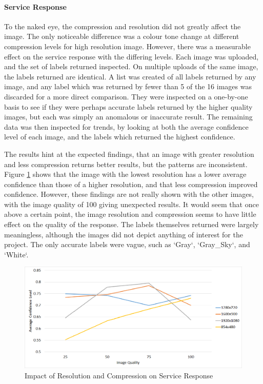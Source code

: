 \documentclass{article}
\begin{document}
\paragraph{Service Response}
To the naked eye, the compression and resolution did not greatly affect the image. The only noticeable difference was a colour tone change at different compression levels for high resolution image. However, there was a measurable effect on the service response with the differing levels. Each image was uploaded, and the set of labels returned inspected. On multiple uploads of the same image, the labels returned are identical. A list was created of all labels returned by any image, and any label which was returned by fewer than 5 of the 16 images was discarded for a more direct comparison. They were inspected on a one-by-one basis to see if they were perhaps accurate labels returned by the higher quality images, but each was simply an anomalous or inaccurate result. The remaining data was then inspected for trends, by looking at both the average confidence level of each image, and the labels which returned the highest confidence. 

The results hint at the expected findings, that an image with greater resolution and less compression returns better results, but the patterns are inconsistent. Figure \ref{fig:ImageResImpact} shows that the image with the lowest resolution has a lower average confidence than those of a higher resolution, and that less compression improved confidence. However, these findings are not really shown with the other images, with the image quality of 100 giving unexpected results. It would seem that once above a certain point, the image resolution and compression seems to have little effect on the quality of the response. The labels themselves returned were largely meaningless, although the images did not depict anything of interest for the project. The only accurate labels were vague, such as `Gray`, `Gray\_Sky`, and `White`.  

\begin{figure}[h]
\centering
\caption{Impact of Resolution and Compression on Service Response\label{fig:ImageResImpact}}
\includegraphics[width=\textwidth]{ImageResImpact}
\end{figure}
\end{document}
